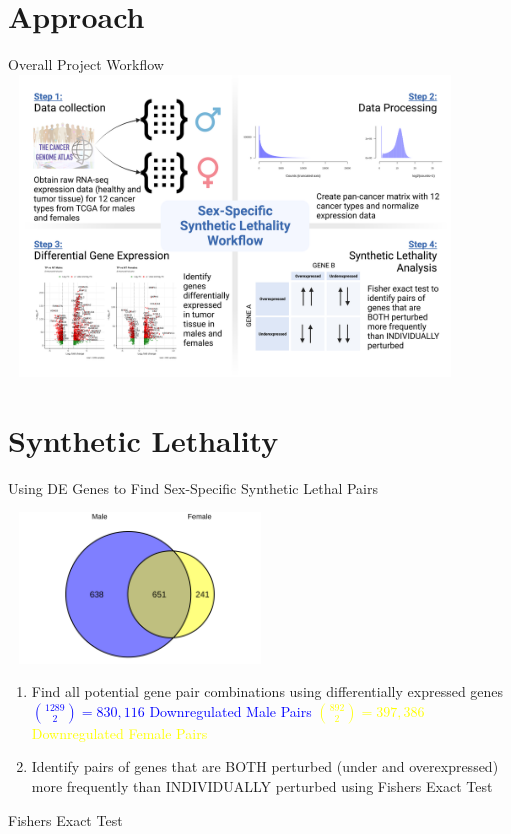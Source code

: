 \documentclass{beamer}
\begin{document}
	
	\section{Approach}
	\begin{frame}{Overall Project Workflow}
		\includegraphics[width=12cm, height=8cm]{project_workflow_slpmcrc_2.png}
	\end{frame}

	\section{Synthetic Lethality}
	\begin{frame}{Using DE Genes to Find Sex-Specific Synthetic Lethal Pairs}
		\begin{center}
			\includegraphics[width=7cm, height=4cm]{all_cancersvenndiagram_malede_vs_femalede_0.9.png}
		\end{center}
		\begin{enumerate}
			\item Find all potential gene pair combinations using differentially expressed genes \newline	
			\textcolor{blue}{${1289 \choose 2 } = 830,116$ Downregulated Male Pairs \newline}
			\textcolor{yellow}{${892 \choose 2 } = 397,386$ Downregulated Female Pairs}
			
			\item Identify pairs of genes that are BOTH perturbed (under and overexpressed) more frequently than INDIVIDUALLY perturbed using Fishers Exact Test
		\end{enumerate}
	\end{frame}

	\begin{frame}{Fishers Exact Test}
		
	\end{frame}
	
\end{document}
